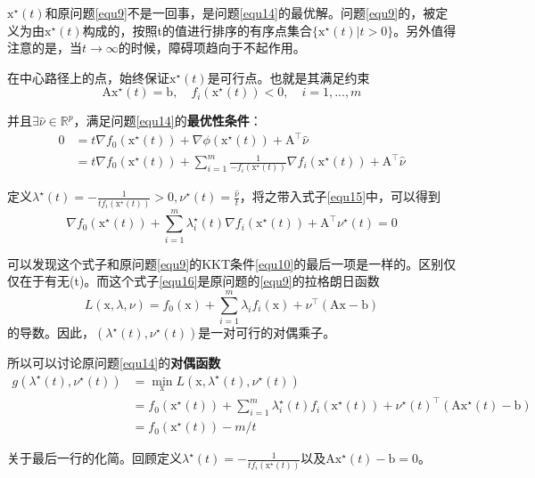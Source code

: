 \documentclass[a4paper]{D:/MyRepo/Script/latex/PaperReadingLog}
\begin{document}
$\mathrm{x}^\star(t)$和原问题\ref{equ9}不是一回事，是问题\ref{equ14}的最优解。问题\ref{equ9}的，被定义为由$\mathrm{x}^\star(t)$构成的，按照t的值进行排序的有序点集合$\{\mathrm{x}^\star(t)|t>0\}$。另外值得注意的是，当$t\rightarrow\infty$的时候，障碍项趋向于不起作用。

在中心路径上的点，始终保证$\mathrm{x}^\star(t)$是可行点。也就是其满足约束
$$
\mathrm{A}\mathrm{x}^\star(t)=\mathrm{b},\quad f_i(\mathrm{x}^\star(t))<0,\quad i=1,...,m
$$

并且$\exists\hat{\nu}\in\mathbb{R}^p$，满足问题\ref{equ14}的\textbf{最优性条件}：
\begin{equation}
    \label{equ15}
    \begin{aligned}
        0&=t\nabla f_0(\mathrm{x}^\star(t))+\nabla\phi(\mathrm{x}^\star(t))+\mathrm{A}^\top\hat{\nu}\\
        &=t\nabla f_0(\mathrm{x}^\star(t))+\sum_{i=1}^m\frac{1}{-f_i(\mathrm{x}^\star(t))}\nabla f_i(\mathrm{x}^\star(t))+\mathrm{A}^\top\hat{\nu}
    \end{aligned}        
\end{equation}

定义$\lambda^\star(t)=-\frac{1}{tf_i(\mathrm{x}^\star(t))}>0,\nu^\star(t)=\frac{\hat{\nu}}{t}$，将之带入式子\ref{equ15}中，可以得到
\begin{equation}
    \label{equ16}
    \nabla f_0(\mathrm{x}^\star(t))+\sum_{i=1}^m\lambda_i^\star(t)\nabla f_i(\mathrm{x}^\star(t))+\mathrm{A}^\top\nu^\star(t)=0
\end{equation}

可以发现这个式子和原问题\ref{equ9}的KKT条件\ref{equ10}的最后一项是一样的。区别仅仅在于有无(t)。而这个式子\ref{equ16}是原问题的\ref{equ9}的拉格朗日函数
$$
L(\mathrm{x},\lambda,\nu)=f_0(\mathrm{x})+\sum_{i=1}^m\lambda_if_i(\mathrm{x})+\nu^\top(\mathrm{A}\mathrm{x}-\mathrm{b})
$$
的导数。因此，$(\lambda^\star(t),\nu^\star(t))$是一对可行的对偶乘子。

所以可以讨论原问题\ref{equ14}的\textbf{对偶函数}
$$
\begin{aligned}
    g(\lambda^\star(t),\nu^\star(t))&=\min_\mathrm{x}L(\mathrm{x},\lambda^\star(t),\nu^\star(t))\\
    &=f_0(\mathrm{x}^\star(t))+\sum_{i=1}^m\lambda^\star_i(t)f_i(\mathrm{x}^\star(t))+\nu^\star(t)^\top(\mathrm{A}\mathrm{x}^\star(t)-\mathrm{b})\\
    &=f_0(\mathrm{x}^\star(t))-m/t
\end{aligned}
$$

关于最后一行的化简。回顾定义$\lambda^\star(t)=-\frac{1}{tf_i(\mathrm{x}^\star(t))}$以及$\mathrm{A}\mathrm{x}^\star(t)-\mathrm{b}=0$。
\end{document}
